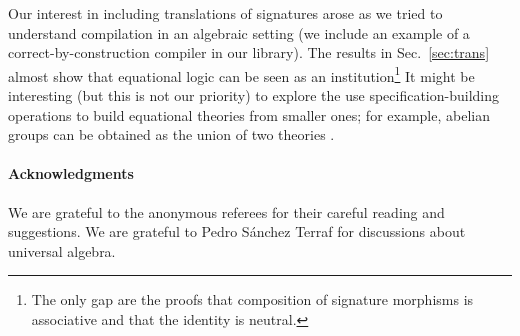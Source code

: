 Our interest in including translations of signatures arose as we tried
to understand compilation in an algebraic setting (we include an
example of a correct-by-construction compiler in our library). The
results in Sec.~\ref{sec:trans} almost show that equational logic can
be seen as an institution\footnote{The only gap are the proofs that
  composition of signature morphisms is associative and that the
  identity is neutral.} It might be interesting (but this is not our
priority) to explore the use specification-building operations to
build equational theories from smaller ones; for example, abelian
groups can be obtained as the union of two theories
\citep[see][p. 232]{sannella2012foundations}.




\paragraph*{Acknowledgments}
  We are grateful to the anonymous referees for their careful reading
  and suggestions. We are grateful to Pedro Sánchez Terraf for discussions
  about universal algebra.

